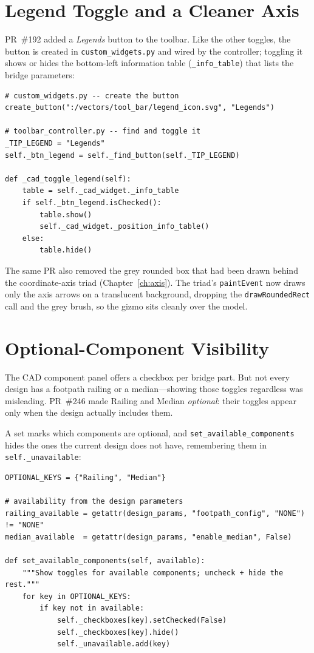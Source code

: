 \section{Legend Toggle and a Cleaner Axis}
PR~\#192 added a \emph{Legends} button to the toolbar. Like the other toggles, the button is
created in \texttt{custom\_widgets.py} and wired by the controller; toggling it shows or hides
the bottom-left information table (\texttt{\_info\_table}) that lists the bridge parameters:

\begin{lstlisting}[caption={The legend toggle button and its handler (\texttt{custom\_widgets.py}, \texttt{toolbar\_controller.py}).},label={lst:legend}]
# custom_widgets.py -- create the button
create_button(":/vectors/tool_bar/legend_icon.svg", "Legends")

# toolbar_controller.py -- find and toggle it
_TIP_LEGEND = "Legends"
self._btn_legend = self._find_button(self._TIP_LEGEND)

def _cad_toggle_legend(self):
    table = self._cad_widget._info_table
    if self._btn_legend.isChecked():
        table.show()
        self._cad_widget._position_info_table()
    else:
        table.hide()
\end{lstlisting}

The same PR also removed the grey rounded box that had been drawn behind the coordinate-axis
triad (Chapter~\ref{ch:axis}). The triad's \texttt{paintEvent} now draws only the axis arrows on
a translucent background, dropping the \texttt{drawRoundedRect} call and the grey brush, so the
gizmo sits cleanly over the model.

\section{Optional-Component Visibility}
The CAD component panel offers a checkbox per bridge part. But not every design has a footpath
railing or a median---showing those toggles regardless was misleading. PR~\#246 made Railing and
Median \emph{optional}: their toggles appear only when the design actually includes them.

A set marks which components are optional, and \texttt{set\_available\_components} hides the ones
the current design does not have, remembering them in \texttt{self.\_unavailable}:

\begin{lstlisting}[caption={Marking components optional and hiding unavailable ones (\texttt{cad\_3d.py}).},label={lst:optional}]
OPTIONAL_KEYS = {"Railing", "Median"}

# availability from the design parameters
railing_available = getattr(design_params, "footpath_config", "NONE") != "NONE"
median_available  = getattr(design_params, "enable_median", False)

def set_available_components(self, available):
    """Show toggles for available components; uncheck + hide the rest."""
    for key in OPTIONAL_KEYS:
        if key not in available:
            self._checkboxes[key].setChecked(False)
            self._checkboxes[key].hide()
            self._unavailable.add(key)
\end{lstlisting}

